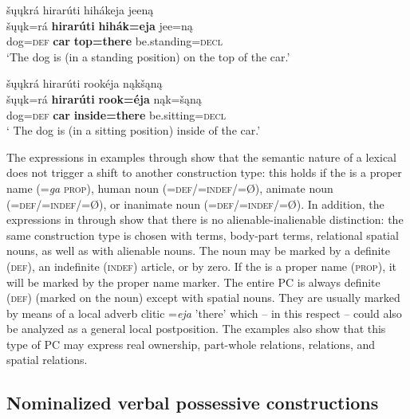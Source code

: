 \documentclass[output=paper]{LSP/langsci}
\begin{document}
\ex 
\glll šųųkrá hirarúti hihákeja jeen\k{a}\\
\v{s}\k{u}\k{u}k=r\'a \textbf{hirar\'uti} \textbf{hih\'ak=eja} jee=n\k{a} \\
dog=\textsc{def}  \textbf{car} \textbf{top=there} be.standing=\textsc{decl} \\
\glt `The dog is (in a standing position) on the top of the car.'

\ex 
\glll šųųkrá hirarúti rookéja n\k{a}k\v{s}\k{a}n\k{a}\\
\v{s}\k{u}\k{u}k=r\'a   \textbf{hirar\'uti} \textbf{rook=\'eja} n\k{a}k=\v{s}\k{a}n\k{a} \\
dog=\textsc{def} \textbf{car} \textbf{inside=there} be.sitting=\textsc{decl} \\
\glt` The dog is (in a sitting position) inside of the car.'
\z
\z

The expressions in examples  through  show that the semantic nature of a lexical  does not trigger a shift to another construction type: this holds if the  is a proper name (=\textit{ga} \textsc{prop}), human noun (=\textsc{def/=indef/}=Ø), animate noun (=\textsc{def/=indef}/=Ø), or inanimate noun (=\textsc{def/=indef}/=Ø). In addition, the expressions in  through  show that there is no alienable-inalienable distinction: the same construction type is chosen with  terms, body-part terms, relational spatial nouns, as well as with alienable nouns. The  noun may be marked by a definite (\textsc{def}), an indefinite (\textsc{indef}) article, or by zero. If the  is a proper name (\textsc{prop}), it will be marked by the proper name marker. The entire PC is always definite (\textsc{def}) (marked on the  noun) except with spatial nouns. They are usually marked by means of a local adverb clitic =\textit{eja} 'there' which – in this respect – could also be analyzed as a general local postposition. The examples also show that this type of PC may express real ownership, part-whole relations,  relations, and spatial relations.
 
\subsection{Nominalized verbal possessive constructions}\label{sec:helmbrecht:3.2} \label{nomvposs}
 
\end{document}
